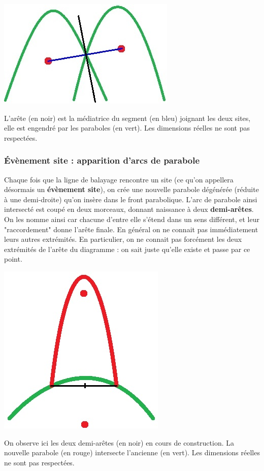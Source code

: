 \documentclass[a4paper, 10pt]{article}
\begin{document}
\begin{center}
\includegraphics[scale=0.4]{PointAnguleux.jpg}  
  
L'arête (en noir) est la médiatrice du segment (en bleu) joignant les deux sites, elle est engendré par les paraboles (en vert). Les dimensions réelles ne sont pas respectées.  
\end{center}

\subsubsection{Évènement site : apparition d'arcs de parabole}
  
Chaque fois que la ligne de balayage rencontre un site (ce qu'on appellera désormais un \textbf{évènement site}), on crée une nouvelle parabole dégénérée (réduite à une demi-droite) qu'on insère dans le front parabolique. L'arc de parabole ainsi intersecté est coupé en deux morceaux, donnant naissance à deux \textbf{demi-arêtes}. On les nomme ainsi car chacune d'entre elle s'étend dans un sens différent, et leur "raccordement" donne l'arête finale. En général on ne connait pas immédiatement leurs autres extrémités. En particulier, on ne connait pas forcément les deux extrémités de l'arête du diagramme : on sait juste qu'elle existe et passe par ce point.  
  
\begin{center}
\includegraphics[scale=0.35]{EvenementSite.jpg}  
  
On observe ici les deux demi-arêtes (en noir) en cours de construction. La nouvelle parabole (en rouge) intersecte l'ancienne (en vert). Les dimensions réelles ne sont pas respectées.  
\end{center}
  
\end{document}
